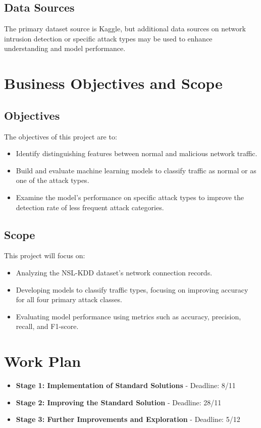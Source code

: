 \documentclass[a4paper,12pt]{article}
\begin{document}
\subsection{Data Sources}
The primary dataset source is Kaggle, but additional data sources on network intrusion detection or specific attack types may be used to enhance understanding and model performance.

\section{Business Objectives and Scope}

\subsection{Objectives}
The objectives of this project are to:
\begin{itemize}
    \item Identify distinguishing features between normal and malicious network traffic.
    \item Build and evaluate machine learning models to classify traffic as normal or as one of the attack types.
    \item Examine the model’s performance on specific attack types to improve the detection rate of less frequent attack categories.
\end{itemize}

\subsection{Scope}
This project will focus on:
\begin{itemize}
    \item Analyzing the NSL-KDD dataset’s network connection records.
    \item Developing models to classify traffic types, focusing on improving accuracy for all four primary attack classes.
    \item Evaluating model performance using metrics such as accuracy, precision, recall, and F1-score.
\end{itemize}

\section{Work Plan}
\begin{itemize}
    \item \textbf{Stage 1: Implementation of Standard Solutions} - Deadline: 8/11
    \item \textbf{Stage 2: Improving the Standard Solution} - Deadline: 28/11
    \item \textbf{Stage 3: Further Improvements and Exploration} - Deadline: 5/12
\end{itemize}
\end{document}
